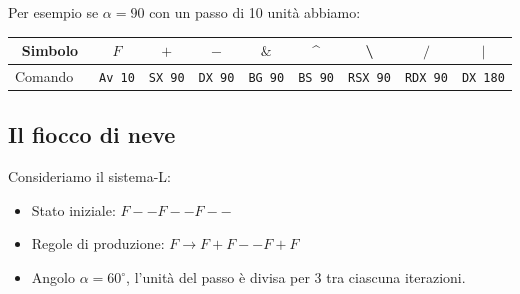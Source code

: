 Per esempio se $\alpha=90$ con un passo di 10 unità abbiamo:
\begin{center}
	\begin{tabular}{|c|c|c|c|c|c|c|c|c|}
		\hline
		Simbolo & $F$ & $+$ & $-$ & $\&$ & \textasciicircum & \textbackslash& $/$ & $|$ \\
		\hline
		Comando \xlogo\ & \texttt{Av 10}&\texttt{SX 90}&\texttt{DX 90}&\texttt{BG 90}&\texttt{BS 90}&\texttt{RSX 90}&\texttt{RDX 90}&\texttt{DX 180}\\
		\hline
	\end{tabular}
\end{center}


\subsection{Il fiocco di neve}
Consideriamo il sistema-L:
\begin{itemize}
 \item [\textbullet] Stato iniziale: $F--F--F--$
 \item [\textbullet] Regole di produzione: $F \rightarrow F+F--F+F$
 \item [\textbullet] Angolo $\alpha=60^{\circ}$, l'unità del passo è divisa per 3 tra ciascuna iterazioni.
\end{itemize}

